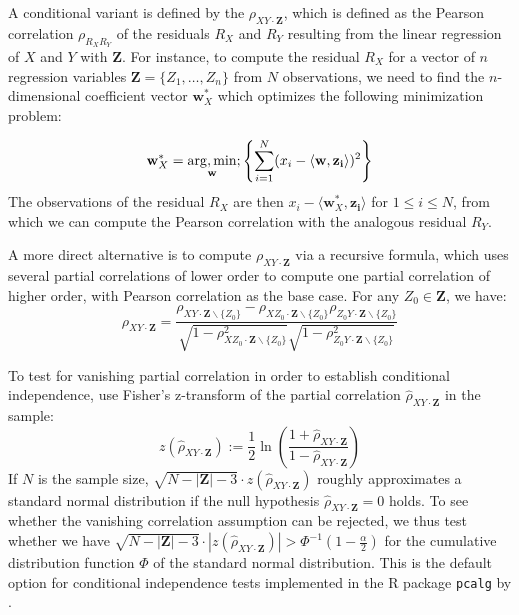 A conditional variant is defined by the \textit{} $\rho_{XY\cdot \mathbf{Z}}$, which is defined as the Pearson correlation $\rho_{R_XR_Y}$ of the residuals $R_X$ and $R_Y$ resulting from the linear regression of $X$ and $Y$ with $\mathbf{Z}$. For instance, to compute the residual $R_X$ for a vector of $n$ regression variables $\mathbf{Z} = \{Z_1,\dots,Z_n\}$ from $N$ observations, we need to find the $n$-dimensional coefficient vector $\mathbf{w}^{*}_X$ which optimizes the following minimization problem:
\newpage 

\begin{equation*}
 \mathbf{w}^{*}_X = \underset{\mathbf{w}}{\operatorname{arg},\operatorname{min}}; \left\{\sum_{i=1}^N (x_i - \langle \mathbf{w}, \mathbf{z_i} \rangle)^2 \right\}
\end{equation*}
The observations of the residual $R_X$ are then $x_i - \langle \mathbf{w}^{*}_X, \mathbf{z_i} \rangle$ for $1 \leq i \leq N$,
from which we can compute the Pearson correlation with the analogous residual $R_Y$.

A more direct alternative is to compute $\rho_{XY\cdot \mathbf{Z}}$ via a recursive formula, which uses several partial correlations of lower order to compute one partial correlation of higher order, with Pearson correlation as the base case. For any $Z_0 \in \mathbf{Z}$, we have:
\begin{equation*}
 \rho_{XY\cdot \mathbf{Z}} = 
 \frac{\rho_{XY\cdot \mathbf{Z}\backslash\{Z_0\}} - \rho_{XZ_0\cdot \mathbf{Z}\backslash\{Z_0\}} \rho_{Z_0Y\cdot \mathbf{Z}\backslash\{Z_0\}}}
      {\sqrt{1-\rho^2_{XZ_0\cdot \mathbf{Z}\backslash\{Z_0\}}} \sqrt{1-\rho^2_{Z_0Y\cdot \mathbf{Z}\backslash\{Z_0\}}}}
\end{equation*}

To test for vanishing partial correlation in order to establish conditional independence,
\citet[5.5]{spirtes_ea_2000} use Fisher's z-transform of the partial correlation $\hat{\rho}_{XY\cdot \mathbf{Z}}$ in the sample:
\begin{equation*}
 z(\hat{\rho}_{XY\cdot \mathbf{Z}}) := \frac{1}{2} \ln\left(\frac{1 + \hat{\rho}_{XY\cdot \mathbf{Z}}}{1 - \hat{\rho}_{XY\cdot \mathbf{Z}}} \right)
\end{equation*}
If $N$ is the sample size, $\sqrt{N - |\mathbf{Z}| - 3} \cdot z(\hat{\rho}_{XY\cdot \mathbf{Z}})$ roughly approximates a standard normal distribution if the null hypothesis $\hat{\rho}_{XY\cdot \mathbf{Z}} = 0$ holds. To see whether the vanishing correlation assumption can be rejected, we thus test whether we have $\sqrt{N - |\mathbf{Z}| - 3} \cdot |z(\hat{\rho}_{XY\cdot \mathbf{Z}})| > \Phi^{-1}(1 - \frac{\alpha}{2})$ for the cumulative distribution function $\Phi$ of the standard normal distribution. This is the default option for conditional independence tests implemented in the R package \texttt{pcalg} by \cite{kalisch_ea_2012}.

